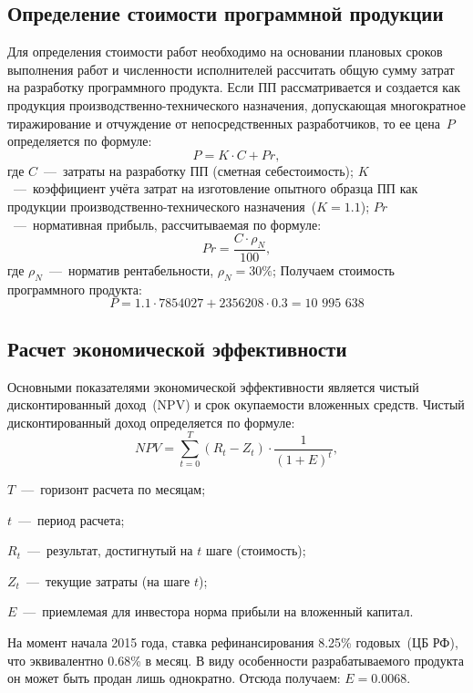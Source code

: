     \subsection{Определение стоимости программной продукции}
        Для определения стоимости работ необходимо на основании плановых сроков
        выполнения работ и численности исполнителей рассчитать общую сумму затрат на
        разработку программного продукта.
        Если ПП рассматривается и создается как продукция производственно-технического назначения,
        допускающая многократное тиражирование и отчуждение от непосредственных разработчиков, то ее цена~$P$ определяется по формуле:
        $$P = K\cdot C+Pr,$$
        где $C$~---~затраты на разработку ПП (сметная себестоимость);
        $K$~---~коэффициент учёта затрат на изготовление опытного образца ПП как продукции производственно-технического назначения~($K=1.1$);
        $Pr$~---~нормативная прибыль, рассчитываемая по формуле:
        $$Pr= \frac {C \cdot  \rho_N} {100},$$
        где $\rho_N$~---~норматив рентабельности, $\rho_N=30\%$;
        Получаем стоимость программного продукта:
        $$ P=1.1\cdot 7 854 027 + 2 356 208\cdot 0.3=10 \hspace{4pt}995  \hspace{4pt}638$$

    \subsection{Расчет экономической эффективности}
        Основными показателями экономической эффективности является чистый дисконтированный доход~(NPV) и срок окупаемости вложенных средств.
        Чистый дисконтированный доход определяется по формуле:
        $$NPV=\sum_{t=0}^T (R_t-Z_t) \cdot  \dfrac{1}{(1+E)^t},$$

        $T$~---~горизонт расчета по месяцам;

        $t$~---~период расчета;

        $R_t$~---~результат, достигнутый на $t$ шаге (стоимость);

        $Z_t$~---~текущие затраты (на шаге $t$);

        $E$~---~приемлемая для инвестора норма прибыли на вложенный капитал.

        На момент начала 2015 года, ставка рефинансирования 8.25\% годовых~(ЦБ РФ),
        что эквивалентно 0.68\% в месяц.
        В виду особенности разрабатываемого продукта он может быть продан лишь
        однократно.
        Отсюда получаем: $E=0.0068.$

